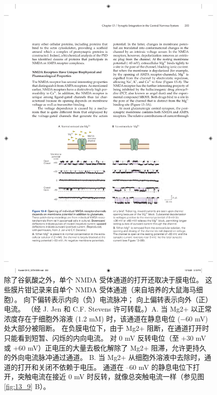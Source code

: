 \begin{figure}[htbp]
	\centering
	\includegraphics[width=0.8\linewidth]{chap13/fig_13_8}
	\caption{除了谷氨酸之外，单个 NMDA 受体通道的打开还取决于膜电位。 这些膜片钳记录来自单个 NMDA 受体通道（来自培养的大鼠海马细胞）。 向下偏转表示内向（负）电流脉冲； 向上偏转表示向外（正）电流。 （经 J. Jen 和 C.F. Stevens 许可转载。）A. 当 Mg2+ 以正常浓度存在于细胞外溶液 (1.2 mM) 时，该通道在静息电位 (−60 mV) 处大部分被阻断。 在负膜电位下，由于 Mg2+ 阻断，在通道打开时只能看到短暂、闪烁的内向电流。 对 0 mV 反转电位（至 +30 mV 或 +60 mV）正电压的大量去极化解除了 Mg2+ 阻滞，允许更持久的外向电流脉冲通过通道。 B. 当 Mg2+ 从细胞外溶液中去除时，通道的打开和关闭不依赖于电压。 通道在 –60 mV 的静息电位下打开，突触电流在接近 0 mV 时反转，就像总突触电流一样（参见图 \ref{fig:13_9} B）。}
	\label{fig:13_8}
\end{figure}


